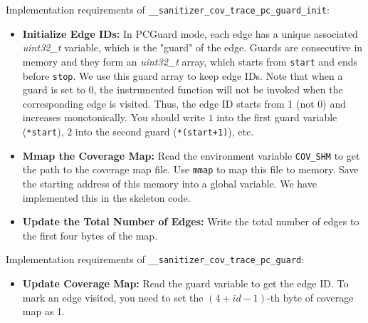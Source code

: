 \documentclass[letterpaper,11pt]{article}
\begin{document}
Implementation requirements of \texttt{__sanitizer_cov_trace_pc_guard_init}:
\begin{itemize}
\item \textbf{Initialize Edge IDs:}
In PCGuard mode, each edge has a unique associated \textit{uint32_t} variable, which is the "guard" of the edge.
Guards are consecutive in memory and they form an \textit{uint32_t} array, which starts from \texttt{start} and ends before \texttt{stop}.
We use this guard array to keep edge IDs.
Note that when a guard is set to 0, the instrumented function will not be invoked when the corresponding edge is visited.
Thus, the edge ID starts from 1 (not 0) and increases monotonically.
You should write $1$ into the first guard variable (\texttt{*start}), $2$ into the second guard (\texttt{*(start+1)}), etc.

\item \textbf{Mmap the Coverage Map:}
Read the environment variable \texttt{COV_SHM} to get the path to the coverage map file.
Use \texttt{mmap} to map this file to memory.
Save the starting address of this memory into a global variable.
We have implemented this in the skeleton code.


\item \textbf{Update the Total Number of Edges:}
Write the total number of edges to the first four bytes of the map.

\end{itemize}

Implementation requirements of \texttt{__sanitizer_cov_trace_pc_guard}:
\begin{itemize}
\item \textbf{Update Coverage Map:}
Read the guard variable to get the edge ID.
To mark an edge visited, you need to set the $(4+id-1)$-th byte of coverage map as 1.
\end{itemize}


\end{document}

